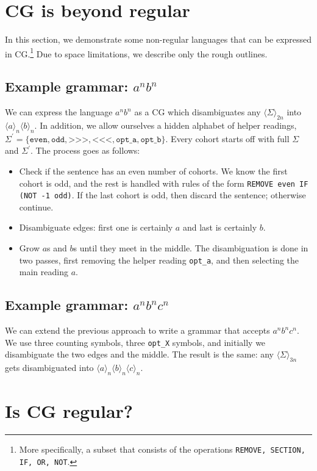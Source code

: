 \documentclass[11pt]{article}
\def\t#1{\texttt{#1}}
\def\maxAmb#1{$\langle \Sigma \rangle_#1$}
\def\maxAmbCFG#1{$\langle \Sigma,\Sigma^{\prime} \rangle_#1$}
\begin{document}
\section{CG is beyond regular}

In this section, we demonstrate some non-regular languages 
that can be expressed in CG.\footnote{More specifically, a subset that consists of
the operations \t{REMOVE, SECTION, IF, OR, NOT}.}
Due to space limitations, we describe only the rough outlines.

\subsection{Example grammar: $a^nb^n$ }

We can express the language $a^nb^n$ as a CG which disambiguates
any \maxAmb{{2n}} into $\langle a \rangle_n \langle b \rangle_n$.
In addition, we allow ourselves a hidden alphabet of helper readings, 
$\Sigma^{\prime} = \{\t{even}, \t{odd}, \t{>>>}, \t{<<<}, \t{opt\_a}, \t{opt\_b}\}$. 
Every cohort starts off with full $\Sigma$ and $\Sigma^{\prime}$.
The process goes as follows:
\begin{itemize}
\item Check if the sentence has an even number of cohorts. We know the first cohort
      is odd, and the rest is handled with rules of the form \t{REMOVE even IF (NOT -1 odd)}.
      If the last cohort is odd, then discard the sentence; otherwise continue.
\item Disambiguate edges: first one is certainly $a$ and last is certainly $b$.
\item Grow $a$s and $b$s until they meet in the middle. The disambiguation is done in two 
      passes, first removing the helper reading \t{opt\_a}, and then selecting the main reading $a$.
\end{itemize}

\subsection{Example grammar: $a^nb^nc^n$}

We can extend the previous approach to write a grammar that accepts $a^nb^nc^n$.
We use three counting symbols, three \t{opt\_X} symbols, and initially we disambiguate
the two edges and the middle. The result is the same: any \maxAmb{{3n}} gets disambiguated
into $\langle a \rangle_n \langle b \rangle_n \langle c \rangle_n$.


\section{Is CG regular?}
\end{document}
